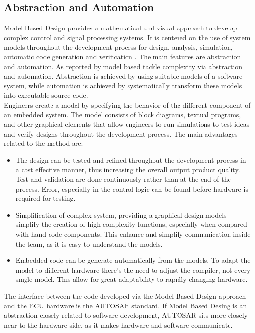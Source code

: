 \documentclass[../main.tex]{subfiles}
\begin{document}
\subsection{Abstraction and Automation}
Model Based Design provides a mathematical and visual approach to develop complex control and signal processing systems. It is centered on the use of system models throughout the development process for design, analysis, simulation, automatic code generation and verification \cite{Mathworks}. The main features are abstraction and automation. As reported by \cite{modelbased} model based tackle complexity via abstraction and automation. Abstraction is achieved by using suitable models of a software system, while automation is achieved by systematically transform these models into executable source code.\\
Engineers create a model by specifying the behavior of the different component of an embedded system. The model consists of block diagrams, textual programs, and other graphical elements that allow engineers to run simulations to test ideas and verify designs throughout the development process. The main advantages related to the method are:
\begin{itemize}
    \item The design can be tested and refined throughout the development process in a cost effective manner, thus increasing the overall output product quality. Test and validation are done continuously rather than at the end of the process. Error, especially in the control logic can be found before hardware is required for testing.
    \item Simplification of complex system, providing a graphical design models simplify the creation of high complexity functions, especially when compared with hand code components. This enhance and simplify communication inside the team, as it is easy to understand the models. 
    \item Embedded code can be generate automatically from the models. To adapt the model to different hardware there's the need to adjust the compiler, not every single model. This allow for great adaptability to rapidly changing hardware. 
\end{itemize}
The interface between the code developed via the Model Based Design approach and the \gls{ECU} hardware is the \gls{AUTOSAR} standard. If Model Based Desing is an abstraction closely related to software development, \gls{AUTOSAR} sits more closely near to the hardware side, as it makes hardware and software communicate.
\end{document}
